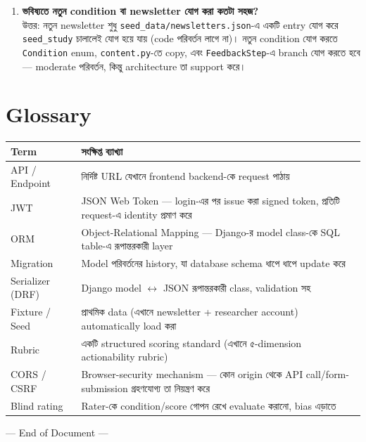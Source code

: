 \documentclass[11pt,a4paper]{article}
\newcommand{\code}[1]{\texttt{\small #1}}
\newcommand{\file}[1]{\texttt{\small #1}}
\begin{document}
\begin{enumerate}[leftmargin=*, label=\textbf{প্রশ্ন \arabic*.}]
\item \textbf{ভবিষ্যতে নতুন condition বা newsletter যোগ করা কতটা সহজ?}\\
উত্তর: নতুন newsletter শুধু \file{seed\_data/newsletters.json}-এ একটি entry যোগ করে
\code{seed\_study} চালালেই যোগ হয়ে যায় (code পরিবর্তন লাগে না)। নতুন condition যোগ করতে
\code{Condition} enum, \code{content.py}-তে copy, এবং \code{FeedbackStep}-এ branch যোগ করতে
হবে --- moderate পরিবর্তন, কিন্তু architecture তা support করে।

\end{enumerate}

\newpage
\section{Glossary}

\begin{longtable}{@{}p{3.6cm}p{12.4cm}@{}}
\toprule
\textbf{Term} & \textbf{সংক্ষিপ্ত ব্যাখ্যা} \\
\midrule
\endhead
API / Endpoint & নির্দিষ্ট URL যেখানে frontend backend-কে request পাঠায় \\
JWT & JSON Web Token --- login-এর পর issue করা signed token, প্রতিটি request-এ identity
  প্রমাণ করে \\
ORM & Object-Relational Mapping --- Django-র model class-কে SQL table-এ রূপান্তরকারী layer \\
Migration & Model পরিবর্তনের history, যা database schema ধাপে ধাপে update করে \\
Serializer (DRF) & Django model $\leftrightarrow$ JSON রূপান্তরকারী class, validation সহ \\
Fixture / Seed & প্রাথমিক data (এখানে newsletter \;+\; researcher account) automatically
  load করা \\
Rubric & একটি structured scoring standard (এখানে ৫-dimension actionability rubric) \\
CORS / CSRF & Browser-security mechanism --- কোন origin থেকে API call/form-submission
  গ্রহণযোগ্য তা নিয়ন্ত্রণ করে \\
Blind rating & Rater-কে condition/score গোপন রেখে evaluate করানো, bias এড়াতে \\
\bottomrule
\end{longtable}

\vspace{1cm}
\begin{center}
{\small\color{black!55} --- End of Document ---}
\end{center}
\end{document}
